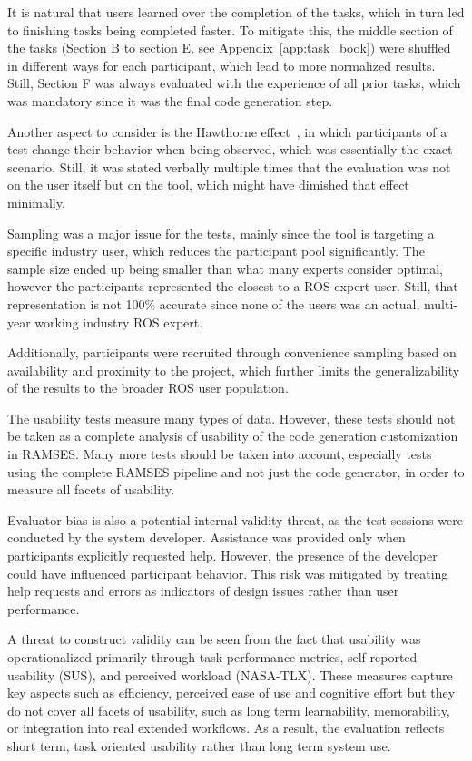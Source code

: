 It is natural that users learned over the completion of the tasks, which in turn led to finishing tasks being completed faster. To mitigate this, the middle section of the tasks (Section B to section E, see Appendix~\ref{app:task_book}) were shuffled in different ways for each participant, which lead to more normalized results. Still, Section F was always evaluated with the experience of all prior tasks, which was mandatory since it was the final code generation step.

Another aspect to consider is the Hawthorne effect~\cite{Hawthorne_effect}, in which participants of a test change their behavior when being observed, which was essentially the exact scenario. Still, it was stated verbally multiple times that the evaluation was not on the user itself but on the tool, which might have dimished that effect minimally.

Sampling was a major issue for the tests, mainly since the tool is targeting a specific industry user, which reduces the participant pool significantly. The sample size ended up being smaller than what many experts consider optimal, however the participants represented the closest to a \gls{ROS} expert user. Still, that representation is not 100\% accurate since none of the users was an actual, multi-year working industry \gls{ROS} expert.

Additionally, participants were recruited through convenience sampling based on availability and proximity to the project, which further limits the generalizability of the results to the broader \gls{ROS} user population.

The usability tests measure many types of data. However, these tests should not be taken as a complete analysis of usability of the code generation customization in \gls{RAMSES}. Many more tests should be taken into account, especially tests using the complete \gls{RAMSES} pipeline and not just the code generator, in order to measure all facets of usability.

Evaluator bias is also a potential internal validity threat, as the test sessions were conducted by the system developer. Assistance was provided only when participants explicitly requested help. However, the presence of the developer could have influenced participant behavior. This risk was mitigated by treating help requests and errors as indicators of design issues rather than user performance.

A threat to construct validity can be seen from the fact that usability was operationalized primarily through task performance metrics, self-reported usability (\gls{SUS}), and perceived workload (NASA-\gls{TLX}). These measures capture key aspects such as efficiency, perceived ease of use and cognitive effort but they do not cover all facets of usability, such as long term learnability, memorability, or integration into real extended workflows. As a result, the evaluation reflects short term, task oriented usability rather than long term system use.

